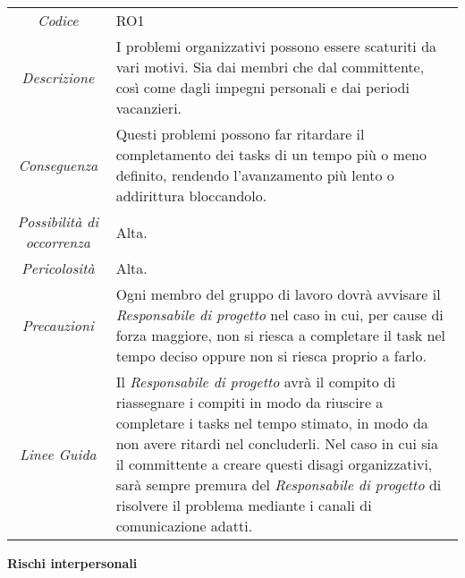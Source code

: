 {{	\begin{center}
		\renewcommand{\arraystretch}{1.4}
		\begin{tabularx}{\textwidth}{|c|X|}
			\hline
			\rowcolor{airforceblue}
			\multicolumn{2}{|c|}{\textit{Problemi organizzativi}}\\
			\hline
			\textit{Codice} & RO1 \\
			\hline
			\textit{Descrizione} & I problemi organizzativi possono essere scaturiti da vari motivi. Sia dai membri che dal committente, così come dagli impegni personali e dai periodi vacanzieri.  \\
			\hline
			\textit{Conseguenza} & Questi problemi possono far ritardare il completamento dei tasks di un tempo più o meno definito, rendendo l'avanzamento più lento o addirittura bloccandolo. \\
			\hline
			\textit{Possibilità di occorrenza} & Alta. \\
			\hline
			\textit{Pericolosità} & Alta. \\
			\hline
			\textit{Precauzioni} & Ogni membro del gruppo di lavoro dovrà avvisare il \textit{Responsabile di progetto} nel caso in cui, per cause di forza maggiore, non si riesca a completare il task nel tempo deciso oppure non si riesca proprio a farlo. \\
			\hline
			\textit{Linee Guida} & Il \textit{Responsabile di progetto} avrà il compito di riassegnare i compiti in modo da riuscire a completare i tasks nel tempo stimato, in modo da non avere ritardi nel concluderli.
			Nel caso in cui sia il committente a creare questi disagi organizzativi, sarà sempre premura del \textit{Responsabile di progetto} di risolvere il problema mediante i canali di comunicazione adatti.  \\
			\hline
		\end{tabularx}
	\end{center}

\quad
\begin{center}
	\LARGE\textbf{Rischi interpersonali}
\end{center}

\def\tabularxcolumn#1{m{#1}}
{
	
	\begin{center}
		\renewcommand{\arraystretch}{1.4}
		 

\end{center}}}}
